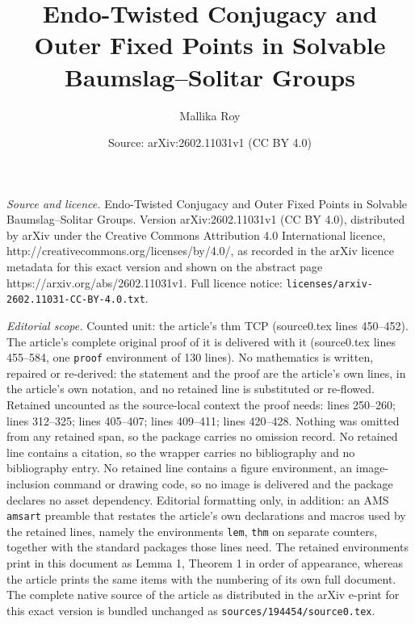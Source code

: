 \documentclass[10pt,a4paper]{amsart}
\title{Endo-Twisted Conjugacy and Outer Fixed Points in Solvable Baumslag--Solitar Groups}
\author{Mallika Roy}
\date{Source: arXiv:2602.11031v1 (CC BY 4.0)}
\begin{document}
\maketitle

\noindent\emph{Source and licence.} Endo-Twisted Conjugacy and Outer Fixed Points in Solvable Baumslag--Solitar Groups. Version arXiv:2602.11031v1 (CC BY 4.0), distributed by arXiv under the Creative Commons Attribution 4.0 International licence, http://creativecommons.org/licenses/by/4.0/, as recorded in the arXiv licence metadata for this exact version and shown on the abstract page https://arxiv.org/abs/2602.11031v1. Full licence notice: \texttt{licenses/arxiv-2602.11031-CC-BY-4.0.txt}.\par\smallskip

\noindent\textit{Editorial scope.} Counted unit: the article's thm TCP (source0.tex lines 450--452). The article's complete original proof of it is delivered with it (source0.tex lines 455--584, one \texttt{proof} environment of 130 lines). No mathematics is written, repaired or re-derived: the statement and the proof are the article's own lines, in the article's own notation, and no retained line is substituted or re-flowed.  Retained uncounted as the source-local context the proof needs: lines 250--260; lines 312--325; lines 405--407; lines 409--411; lines 420--428.  Nothing was omitted from any retained span, so the package carries no omission record.  No retained line contains a citation, so the wrapper carries no bibliography and no bibliography entry.  No retained line contains a figure environment, an image-inclusion command or drawing code, so no image is delivered and the package declares no asset dependency.  Editorial formatting only, in addition: an AMS \texttt{amsart} preamble that restates the article's own declarations and macros used by the retained lines, namely the environments \texttt{lem}, \texttt{thm} on separate counters, together with the standard packages those lines need.  The retained environments print in this document as Lemma 1, Theorem 1 in order of appearance, whereas the article prints the same items with the numbering of its own full document.  The complete native source of the article as distributed in the arXiv e-print for this exact version is bundled unchanged as \texttt{sources/194454/source0.tex}.
\end{document}
